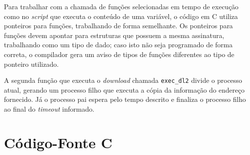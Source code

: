 \documentclass{article}
\begin{document}
Para trabalhar com a chamada de funções selecionadas em tempo de execução como
no \textit{script} que executa o conteúdo de uma variável, o código em C utiliza
ponteiros para funções, trabalhando de forma semelhante. Os ponteiros para
funções devem apontar para estruturas que possuem a mesma assinatura,
trabalhando como um tipo de dado; caso isto não seja programado de forma
correta, o compilador gera um aviso de tipos de funções diferentes ao tipo de
ponteiro utilizado.

A segunda função que executa o \textit{download} chamada \texttt{exec\_dl2}
divide o processo atual, gerando um processo filho que executa a cópia da
informação do endereço fornecido. Já o processo pai espera pelo tempo descrito e
finaliza o processo filho ao final do \textit{timeout} informado.

\section{Código-Fonte C}
\end{document}
